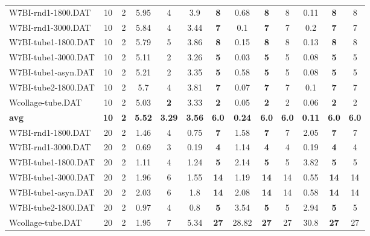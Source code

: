\begin{table}[h]
{\begin{tabular}{lcccccccccccc}
W7BI-rnd1-1800.DAT & 10 & 2 & 5.95 & 4 & 3.9 &  \textbf{8} & 0.68 &  \textbf{8} & 8 &  \textcolor{blue2}{0.11} &  \textbf{8} & 8 \\
W7BI-rnd1-3000.DAT & 10 & 2 & 5.84 & 4 & 3.44 &  \textbf{7} &  \textcolor{blue2}{0.1} &  \textbf{7} & 7 & 0.2 &  \textbf{7} & 7 \\
W7BI-tube1-1800.DAT & 10 & 2 & 5.79 & 5 & 3.86 &  \textbf{8} & 0.15 &  \textbf{8} & 8 &  \textcolor{blue2}{0.13} &  \textbf{8} & 8 \\
W7BI-tube1-3000.DAT & 10 & 2 & 5.11 & 2 & 3.26 &  \textbf{5} &  \textcolor{blue2}{0.03} &  \textbf{5} & 5 & 0.08 &  \textbf{5} & 5 \\
W7BI-tube1-asyn.DAT & 10 & 2 & 5.21 & 2 & 3.35 &  \textbf{5} & 0.58 &  \textbf{5} & 5 &  \textcolor{blue2}{0.08} &  \textbf{5} & 5 \\
W7BI-tube2-1800.DAT & 10 & 2 & 5.7 & 4 & 3.81 &  \textbf{7} &  \textcolor{blue2}{0.07} &  \textbf{7} & 7 & 0.1 &  \textbf{7} & 7 \\
Wcollage-tube.DAT & 10 & 2 & 5.03 &  \textbf{2} & 3.33 &  \textbf{2} &  \textcolor{blue2}{0.05} &  \textbf{2} & 2 & 0.06 &  \textbf{2} & 2 \\
\cline{1-13} \textbf{avg} & \textbf{10} & \textbf{2} & \textbf{5.52} & \textbf{3.29} & \textbf{3.56} & \textbf{6.0} & \textbf{0.24} & \textbf{6.0} & \textbf{6.0} & \textbf{0.11} & \textbf{6.0} & \textbf{6.0} \\ \cline{1-13}
W7BI-rnd1-1800.DAT & 20 & 2 & 1.46 & 4 &  \textcolor{blue2}{0.75} &  \textbf{7} & 1.58 &  \textbf{7} & 7 & 2.05 &  \textbf{7} & 7 \\
W7BI-rnd1-3000.DAT & 20 & 2 & 0.69 & 3 &  \textcolor{blue2}{0.19} &  \textbf{4} & 1.14 &  \textbf{4} & 4 &  \textcolor{blue2}{0.19} &  \textbf{4} & 4 \\
W7BI-tube1-1800.DAT & 20 & 2 &  \textcolor{blue2}{1.11} & 4 & 1.24 &  \textbf{5} & 2.14 &  \textbf{5} & 5 & 3.82 &  \textbf{5} & 5 \\
W7BI-tube1-3000.DAT & 20 & 2 & 1.96 & 6 & 1.55 &  \textbf{14} & 1.19 &  \textbf{14} & 14 &  \textcolor{blue2}{0.55} &  \textbf{14} & 14 \\
W7BI-tube1-asyn.DAT & 20 & 2 & 2.03 & 6 & 1.8 &  \textbf{14} & 2.08 &  \textbf{14} & 14 &  \textcolor{blue2}{0.58} &  \textbf{14} & 14 \\
W7BI-tube2-1800.DAT & 20 & 2 & 0.97 & 4 &  \textcolor{blue2}{0.8} &  \textbf{5} & 3.54 &  \textbf{5} & 5 & 2.94 &  \textbf{5} & 5 \\
Wcollage-tube.DAT & 20 & 2 &  \textcolor{blue2}{1.95} & 7 & 5.34 &  \textbf{27} & 28.82 &  \textbf{27} & 27 & 30.8 &  \textbf{27} & 27 \\

\end{tabular}}
\end{table}

